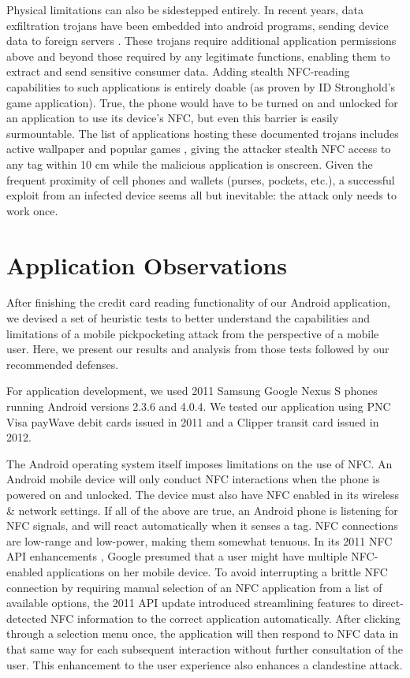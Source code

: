 \documentclass{sig-alternate}
\begin{document}
Physical limitations can also be sidestepped entirely.  In recent years, data exfiltration trojans have been embedded into android programs, sending device data to foreign servers \cite{droiddreamlight}.  These trojans require additional application permissions above and beyond those required by any legitimate functions, enabling them to extract and send sensitive consumer data.  Adding stealth NFC-reading capabilities to such applications is entirely doable (as proven by ID Stronghold's game application).  True, the phone would have to be turned on and unlocked for an application to use its device's NFC, but even this barrier is easily surmountable.  The list of applications hosting these documented trojans includes active wallpaper and popular games \cite{venturebeat-malicious-wallpaper}, giving the attacker stealth NFC access to any tag within 10 cm while the malicious application is onscreen.  Given the frequent proximity of cell phones and wallets (purses, pockets, etc.), a successful exploit from an infected device seems all but inevitable: the attack only needs to work once.  

\section{Application Observations}
After finishing the credit card reading functionality of our Android application, we devised a set of heuristic tests to better understand the capabilities and limitations of a mobile pickpocketing attack from the perspective of a mobile user.  Here, we present our results and analysis from those tests followed by our recommended defenses.  

For application development, we used 2011 Samsung Google Nexus S phones running Android versions 2.3.6 and 4.0.4.  We tested our application using PNC Visa payWave debit cards issued in 2011 and a Clipper transit card issued in 2012.

The Android operating system itself imposes limitations on the use of NFC.  An Android mobile device will only conduct NFC interactions when the phone is powered on and unlocked.  The device must also have NFC enabled in its wireless 
\& network settings.  If all of the above are true, an Android phone is listening for NFC signals, and will react automatically when it senses a tag.  NFC connections are low-range and low-power, making them somewhat tenuous.  In its 2011 NFC API enhancements \cite{android-developers-nfc-basics}, Google presumed that a user might have multiple NFC-enabled applications on her mobile device.  To avoid interrupting a brittle NFC connection by requiring manual selection of an NFC application from a list of available options, the 2011 API update introduced streamlining features to direct-detected NFC information to the correct application automatically.  After clicking through a selection menu once, the application will then respond to NFC data in that same way for each subsequent interaction without further consultation of the user.  This enhancement to the user experience also enhances a clandestine attack.
\end{document}
